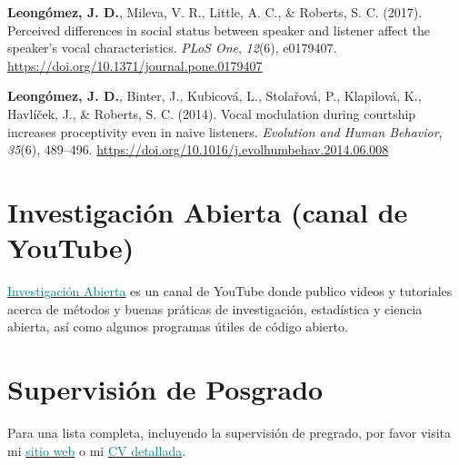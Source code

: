 \documentclass[11pt, a4paper]{awesome-cv}
\begin{document}
\leavevmode\hypertarget{ref-Leongomez2017}{}%
\textbf{Leongómez, J. D.}, Mileva, V. R., Little, A. C., \& Roberts, S.
C. (2017). {Perceived differences in social status between speaker and
listener affect the speaker's vocal characteristics}. \emph{PLoS One},
\emph{12}(6), e0179407.
\url{https://doi.org/10.1371/journal.pone.0179407}

\leavevmode\hypertarget{ref-Leongomez2014}{}%
\textbf{Leongómez, J. D.}, Binter, J., Kubicová, L., Stolařová, P.,
Klapilová, K., Havlíček, J., \& Roberts, S. C. (2014). {Vocal modulation
during courtship increases proceptivity even in naive listeners}.
\emph{Evolution and Human Behavior}, \emph{35}(6), 489--496.
\url{https://doi.org/10.1016/j.evolhumbehav.2014.06.008}

\endgroup

\hypertarget{investigaciuxf3n-abierta-canal-de-youtube}{%
\section{Investigación Abierta (canal de
YouTube)}\label{investigaciuxf3n-abierta-canal-de-youtube}}

\href{https://www.youtube.com/c/InvestigaciónAbierta}{\textcolor{red}{\faYoutubePlay}
\textcolor{teal}{Investigación Abierta}} es un canal de YouTube donde
publico videos y tutoriales acerca de métodos y buenas práticas de
investigación, estadística y ciencia abierta, así como algunos programas
útiles de código abierto.

\hypertarget{supervisiuxf3n-de-posgrado}{%
\section{Supervisión de Posgrado}\label{supervisiuxf3n-de-posgrado}}

Para una lista completa, incluyendo la supervisión de pregrado, por
favor visita mi
\href{https://jdleongomez.info/es/team/\#students}{\textcolor{teal}{sitio web}}
o mi
\href{https://jdleongomez.info/es/files/jdl_cv_es.pdf}{\textcolor{teal}{CV detallada}}.
\end{document}
